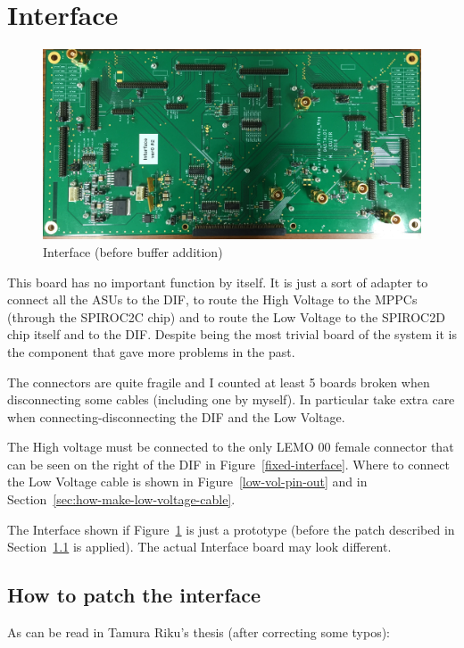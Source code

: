  
\section{Interface}
\begin{figure}[H]
  \centering \includegraphics[width=0.8\linewidth, frame]{Interface}
  \caption{Interface (before buffer addition)}\label{fig:Interface}
\end{figure}
This board has no important function by itself. It is just a sort of adapter to
connect all the ASUs to the DIF, to route the High Voltage to the MPPCs (through
the SPIROC2C chip) and to route the Low Voltage to the SPIROC2D chip itself and
to the DIF. Despite being the most trivial board of the system it is the
component that gave more problems in the past.

The connectors are quite fragile and I counted at least 5 boards broken when
disconnecting some cables (including one by myself). In particular take extra
care when connecting-disconnecting the DIF and the Low Voltage.

The High voltage must be connected to the only LEMO 00 female connector that can
be seen on the right of the DIF in Figure~\ref{fixed-interface}. Where to
connect the Low Voltage cable is shown in Figure~\ref{low-vol-pin-out} and in
Section~\ref{sec:how-make-low-voltage-cable}.

The Interface shown if Figure~\ref{fig:Interface} is just a prototype (before
the patch described in Section~\ref{sec:how-patch-interface} is applied). The
actual Interface board may look different.

\subsection{How to patch the interface}\label{sec:how-patch-interface}
As can be read in Tamura Riku's thesis (after correcting some typos):

